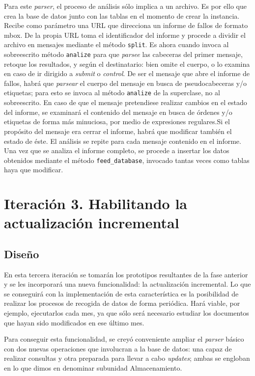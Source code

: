 Para este \textit{parser}, el proceso de análisis sólo implica a un archivo.
Es por ello que crea la base de datos junto con las tablas en el momento
de crear la instancia.
Recibe como parámetro una URL que direcciona un informe de fallos de formato
mbox. De la propia URL toma el identificador del informe y procede a dividir
el archivo en mensajes mediante el método \texttt{split}. Es ahora cuando
invoca al sobreescrito método \texttt{analize} para que \textit{parsee} las cabeceras
del primer mensaje, retoque los resultados, y según el destinatario:
bien omite el cuerpo, o lo examina
en caso de ir dirigido a \textit{submit} o \textit{control}. De ser el mensaje
que abre el informe de fallos, habrá que \textit{parsear} el cuerpo del mensaje
en busca de pseudocabeceras y/o etiquetas; para esto se invoca al método
\texttt{analize} de la superclase, no al sobreescrito. En caso de que el mensaje
pretendiese realizar cambios en el estado del informe, se examinará el contenido
del mensaje en busca de órdenes y/o etiquetas de forma más minuciosa, por medio
de expresiones regulares.Si el propósito del mensaje era cerrar el informe,
habrá que modificar también el estado de éste. El análisis se repite para cada
mensaje contenido en el informe.
Una vez que se analiza el informe completo, se procede a insertar los datos obtenidos
mediante el método \texttt{feed\_database}, invocado tantas veces como tablas haya
que modificar.


\section{Iteración 3. Habilitando la actualización incremental}
\subsection{Diseño}
En esta tercera iteración se tomarán los prototipos resultantes de la fase
anterior y se les incorporará una nueva funcionalidad: la actualización incremental.
Lo que se conseguirá con la implementación de esta característica es la
posibilidad de realizar los procesos de recogida de datos de forma periódica.
Hará viable, por ejemplo, ejecutarlos cada mes, ya que sólo será necesario
estudiar los documentos que hayan sido modificados en ese último mes.

Para conseguir esta funcionalidad, se creyó conveniente ampliar el \textit{parser}
básico con dos nuevas operaciones que involucran a la base de datos: una capaz
de realizar consultas y otra preparada para llevar a cabo \textit{updates}; ambas
se engloban en lo que dimos en denominar subunidad {Almacenamiento}.


